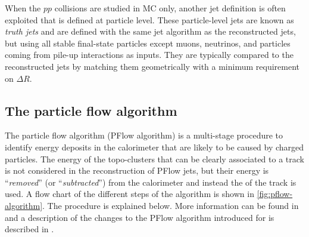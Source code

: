
When the $pp$ collisions are studied in MC only, another jet definition is often exploited that is defined at particle level. These particle-level jets are known as \emph{truth jets} and are defined with the same jet algorithm as the reconstructed jets, but using all stable final-state particles except muons, neutrinos, and particles coming from pile-up interactions as inputs. They are typically compared to the reconstructed jets by matching them geometrically with a minimum requirement on $\Delta R$.




\subsection{The particle flow algorithm}
\label{subsec:pflow-algorithm}
The particle flow algorithm (PFlow algorithm) is a multi-stage procedure to identify energy deposits in the calorimeter that are likely to be caused by charged particles. The energy of the topo-clusters that can be clearly associated to a track is not considered in the reconstruction of PFlow jets, but their energy is ``\emph{removed}'' (or ``\emph{subtracted}'') from the calorimeter and instead the \pT of the track is used. A flow chart of the different steps of the algorithm is shown in \cref{fig:pflow-algorithm}. The procedure is explained below. More information can be found in  and a description of the changes to the PFlow algorithm introduced for \RunTwo is described in .

